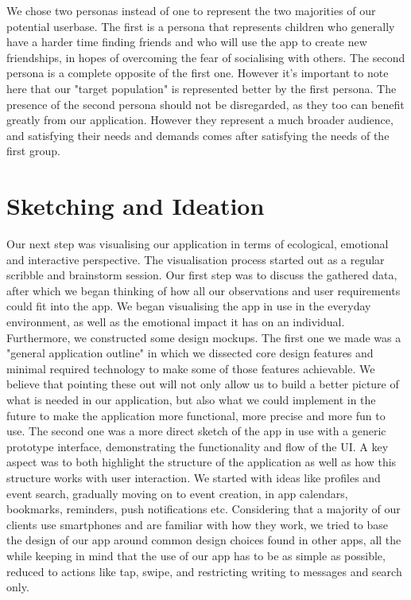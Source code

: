 \documentclass[12pt]{report}
\begin{document}
	\newpage
	We chose two personas instead of one to represent the two majorities of our potential userbase. The first is a persona that represents children who generally have a harder time finding friends and who will use the app to create new friendships, in hopes of overcoming the fear of socialising with others. The second persona is a complete opposite of the first one. However it's important to note here that our "target population" is represented better by the first persona. The presence of the second persona should not be disregarded, as they too can benefit greatly from our application. However they represent a much broader audience, and satisfying their needs and demands comes after satisfying the needs of the first group. 
	
	\section*{\huge Sketching and Ideation}
	Our next step was visualising our application in terms of ecological, emotional and interactive perspective. The visualisation process started out as a regular scribble and brainstorm session. Our first step was to discuss the gathered data, after which we began thinking of how all our observations and user requirements could fit into the app. We began visualising the app in use in the everyday environment, as well as the emotional impact it has on an individual. Furthermore, we constructed some design mockups. The first one we made was a "general application outline" in which we dissected core design features and minimal required technology to make some of those features achievable. We believe that pointing these out will not only allow us to build a better picture of what is needed in our application, but also what we could implement in the future to make the application more functional, more precise and more fun to use. The second one was a more direct sketch of the app in use with a generic prototype interface, demonstrating the functionality and flow of the UI. A key aspect was to both highlight the structure of the application as well as how this structure works with user interaction. We started with ideas like profiles and event search, gradually moving on to event creation, in app calendars, bookmarks, reminders, push notifications etc. Considering that a majority of our clients use smartphones and are familiar with how they work, we tried to base the design of our app around common design choices found in other apps, all the while keeping in mind that the use of our app has to be as simple as possible, reduced to actions like tap, swipe, and restricting writing to messages and search only.
	
\end{document}

